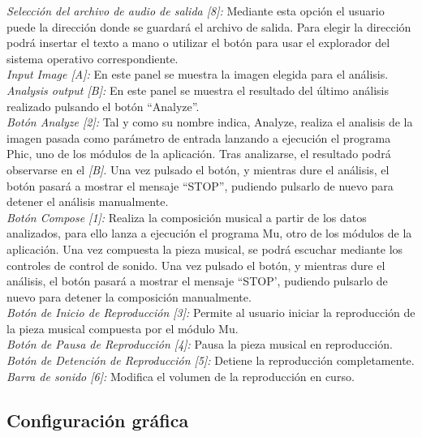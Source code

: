 		\noindent\textit{Selección del archivo de audio de salida [8]:}  Mediante esta opción el usuario puede la dirección donde se guardará el archivo de salida. Para elegir la dirección podrá insertar el texto a mano o utilizar el botón para usar el explorador del sistema operativo correspondiente.\\
		
		\noindent\textit{Input Image [A]:} En este panel se muestra la imagen elegida para el análisis.\\
		
		\noindent\textit{Analysis output [B]:} En este panel se muestra el resultado del último análisis realizado pulsando el botón ``Analyze''.\\
		
		\noindent\textit{Botón Analyze [2]:} Tal y como su nombre indica, Analyze, realiza el analisis de la imagen pasada como parámetro de entrada lanzando a ejecución el programa Phic, uno de los módulos de la aplicación. Tras analizarse, el resultado podrá observarse en el \textit{[B]}. Una vez pulsado el botón, y mientras dure el análisis, el botón pasará a mostrar el mensaje ``STOP'', pudiendo pulsarlo de nuevo para detener el análisis manualmente.\\
		
		\noindent\textit{Botón Compose [1]:} Realiza la composición musical a partir de los datos analizados, para ello lanza a ejecución el programa Mu, otro de los módulos de la aplicación. Una vez compuesta la pieza musical, se podrá escuchar mediante los controles de control de sonido. Una vez pulsado el botón, y mientras dure el análisis, el botón pasará a mostrar el mensaje ``STOP', pudiendo pulsarlo de nuevo para detener la composición manualmente.\\
		
		\noindent\textit{Botón de Inicio de Reproducción [3]:} Permite al usuario iniciar la reproducción de la pieza musical compuesta por el módulo Mu.\\
		
		\noindent\textit{Botón de Pausa de Reproducción [4]:} Pausa la pieza musical en reproducción.\\
		
		\noindent\textit{Botón de Detención de Reproducción [5]:} Detiene la reproducción completamente.\\
		
		\noindent\textit{Barra de sonido [6]:} Modifica el volumen de la reproducción en curso.

		
	\subsection{Configuración gráfica}
		
